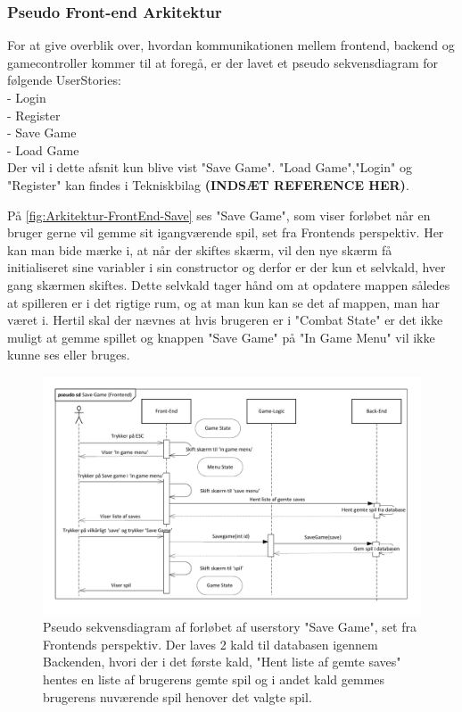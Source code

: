 \subsubsection{Pseudo Front-end Arkitektur}
For at give overblik over, hvordan kommunikationen mellem frontend, backend og gamecontroller kommer til at foregå, er der lavet et pseudo sekvensdiagram for følgende UserStories:
\\
- Login\\
- Register\\
- Save Game\\
- Load Game\\

Der vil i dette afsnit kun blive vist "Save Game". "Load Game","Login" og "Register" kan findes i Tekniskbilag \textbf{(INDSÆT REFERENCE HER)}.

\noindent På \autoref{fig:Arkitektur-FrontEnd-Save} ses "Save Game", som viser forløbet når en bruger gerne vil gemme sit igangværende spil, set fra Frontends perspektiv. Her kan man bide mærke i, at når der skiftes skærm, vil den nye skærm få initialiseret sine variabler i sin constructor og derfor er der kun et selvkald, hver gang skærmen skiftes. Dette selvkald tager hånd om at opdatere mappen således at spilleren er i det rigtige rum, og at man kun kan se det af mappen, man har været i.
Hertil skal der nævnes at hvis brugeren er i "Combat State" er det ikke muligt at gemme spillet og knappen "Save Game" på "In Game Menu" vil ikke kunne ses eller bruges.\\

\begin{figure}[H]
\centering
\includegraphics[width = \textwidth]{02-Body/Images/Front-End_-_Arkitektur-savegame.pdf}
\caption{Pseudo sekvensdiagram af forløbet af userstory "Save Game", set fra Frontends perspektiv. Der laves 2 kald til databasen igennem Backenden, hvori der i det første kald,  "Hent liste af gemte saves" hentes en liste af brugerens gemte spil og i andet kald gemmes brugerens nuværende spil henover det valgte spil.}
\label{fig:Arkitektur-FrontEnd-Save}
\end{figure}

\newpage
